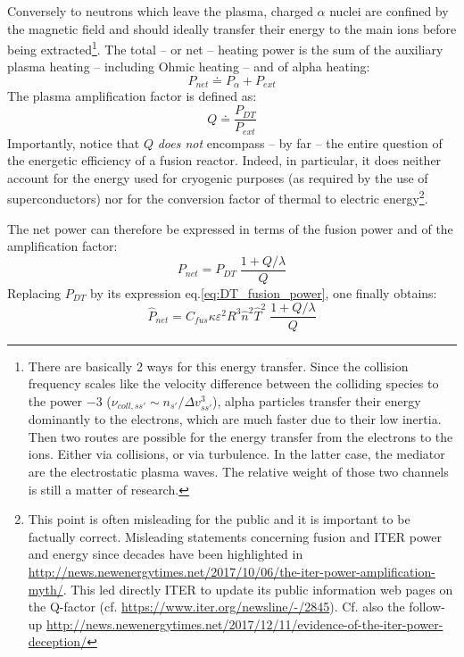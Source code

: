 Conversely to neutrons which leave the plasma, charged $\alpha$ nuclei are confined by the magnetic field and should ideally transfer their energy to the main ions before being extracted\footnote{There are basically 2 ways for this energy transfer. Since the collision frequency scales like the velocity difference between the colliding species to the power $-3$ ($\nu_{coll,ss'}\sim n_{s'}/\Delta v_{ss'}^3$), alpha particles transfer their energy dominantly to the electrons, which are much faster due to their low inertia. Then two routes are possible for the energy transfer from the electrons to the ions. Either via collisions, or via turbulence. In the latter case, the mediator are the electrostatic plasma waves. The relative weight of those two channels is still a matter of research.}. The total -- or net -- heating power is the sum of the auxiliary plasma heating -- including Ohmic heating -- and of alpha heating:
\begin{equation}
P_{net} \doteq P_\alpha + P_{ext}
\label{eq:net_power}
\end{equation}
The plasma amplification factor is defined as:
\begin{equation}
Q \doteq \frac{P_{DT}}{P_{ext}}
\label{eq:Q}
\end{equation}
Importantly, notice that $Q$ \emph{does not} encompass -- by far -- the entire question of the energetic efficiency of a fusion reactor. Indeed, in particular, it does neither account for the energy used for cryogenic purposes (as required by the use of superconductors) nor for the conversion factor of thermal to electric energy\footnote{This point is often misleading for the public and it is important to be factually correct. Misleading statements concerning fusion and ITER power and energy since decades have been highlighted in \url{http://news.newenergytimes.net/2017/10/06/the-iter-power-amplification-myth/}. This led directly ITER to update its public information web pages on the Q-factor (cf. \url{https://www.iter.org/newsline/-/2845}).  Cf. also the follow-up \url{http://news.newenergytimes.net/2017/12/11/evidence-of-the-iter-power-deception/}}.

The net power can therefore be expressed in terms of the fusion power and of the amplification factor:
\begin{equation}
\boxed{
P_{net} = P_{DT} \; \frac{1+Q/\lambda}{Q}
}
\label{eq:Pnet_PDT_Q}
\end{equation}
Replacing $P_{DT}$ by its expression eq.\ref{eq:DT_fusion_power}, one finally obtains:
\begin{equation}
  \hat P_{net} = C_{fus} \kappa \varepsilon^2 R^3 \hat n^2 \hat T^2 \; \frac{1+Q/\lambda}{Q}
\label{eq:Pnet_QnTR}
\end{equation}


